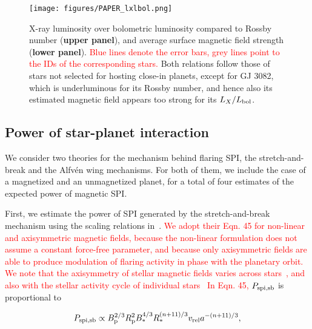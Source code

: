 \documentclass[twocolumn]{aastex631}
\begin{document}
\begin{figure}[ht!]
    \begin{centering}
        \texttt{[image: figures/PAPER\_lxlbol.png]}
        \caption{
           X-ray luminosity over bolometric luminosity compared to Rossby number (\textbf{upper panel}), and average surface magnetic field strength (\textbf{lower panel}). \textcolor{red}{Blue lines denote the error bars, grey lines point to the IDs of the corresponding stars.} Both relations follow those of stars not selected for hosting close-in planets, except for GJ 3082, which is underluminous for its Rossby number, and hence also its estimated magnetic field appears too strong for its $L_X/L_{\rm bol}$.
        }
        \label{fig:lx}
    \end{centering}
\end{figure}

\subsection{Power of star-planet interaction}
\label{sec:methods:pspi}
We consider two theories for the mechanism behind flaring SPI, the stretch-and-break and the Alfv\'en wing mechanisms. For both of them, we include the case of a magnetized and an unmagnetized planet, for a total of four estimates of the expected power of magnetic SPI.

First, we estimate the power of SPI generated by the stretch-and-break mechanism using the scaling relations in~\cite{lanza2012starplanet}. \textcolor{red}{We adopt their Eqn. 45 for non-linear and axisymmetric magnetic fields, because the non-linear formulation does not assume a constant force-free parameter, and because only axisymmetric fields are able to produce modulation of flaring activity in phase with the planetary orbit. We note that the axisymmetry of stellar magnetic fields varies across stars~\citep[e.g.,][]{donati2009magnetic, donati2008largescale, morin2008largescale, morin2010largescale}, and also with the stellar activity cycle of individual stars~\citep[e.g.,][]{borosaikia2016solarlike, lehmann2021identifying} In Eqn. 45,} $P_{\rm spi,sb}$ is proportional to

\begin{equation}
    P_{\rm spi,sb} \propto B_{\rm p}^{2/3} R_{\rm p}^2 B_*^{4/3} R_*^{(n+11) / 3} v_{\rm rel} a^{-(n+11) / 3},
\end{equation}
\end{document}
